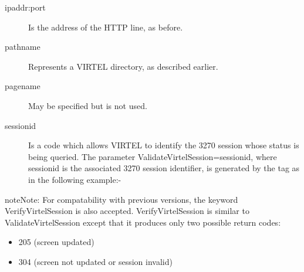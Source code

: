 \documentclass[letterpaper,10pt,english]{sphinxmanual}
\begin{document}
\begin{sphinxVerbatim}[commandchars=\\\{\}]
\end{sphinxVerbatim}
\begin{description}
\item[{ipaddr:port}] \leavevmode
Is the address of the HTTP line, as before.

\item[{pathname}] \leavevmode
Represents a VIRTEL directory, as described earlier.

\item[{pagename}] \leavevmode
May be specified but is not used.

\item[{sessionid}] \leavevmode
Is a code which allows VIRTEL to identify the 3270 session whose
status is being queried. The parameter ValidateVirtelSession=sessionid, where sessionid is the associated 3270 session identifier, is generated by the  tag as in the following example:-

\end{description}

\begin{sphinxVerbatim}[commandchars=\\\{\}]
\end{sphinxVerbatim}

\begin{sphinxadmonition}{note}{Note:}
For compatability with previous versions, the keyword VerifyVirtelSession is also accepted. VerifyVirtelSession is similar to ValidateVirtelSession except that it produces only two possible return codes:
\begin{itemize}
\item {} 
205 (screen updated)

\item {} 
304 (screen not updated or session invalid)

\end{itemize}
\end{sphinxadmonition}
\end{document}
